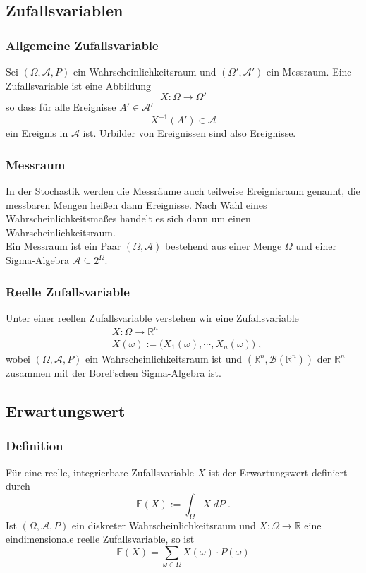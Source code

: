 \documentclass[a4paper]{article}
\begin{document}
\subsection{Zufallsvariablen}

\subsubsection{Allgemeine Zufallsvariable}
Sei $(\Omega, \mathcal{A}, P)$ ein Wahrscheinlichkeitsraum und $(\Omega', \mathcal{A}')$ ein Messraum. Eine Zufallsvariable ist eine Abbildung
$$X : \Omega \to \Omega'$$ 
so dass für alle Ereignisse $A' \in  \mathcal{A}'$
$$ X^{-1} (A') \in \mathcal{A}$$
 ein Ereignis in $\mathcal{A}$ ist. Urbilder von Ereignissen sind also Ereignisse.

\subsubsection{Messraum}
In der Stochastik werden die Messräume auch teilweise Ereignisraum genannt, die messbaren Mengen heißen dann Ereignisse. Nach Wahl eines Wahrscheinlichkeitsmaßes handelt es sich dann um einen Wahrscheinlichkeitsraum.\\

Ein Messraum ist ein Paar $(\Omega, \mathcal{A})$ bestehend aus einer Menge $\Omega$ und einer Sigma-Algebra $\mathcal{A} \subseteq 2^{\Omega}$.

\subsubsection{Reelle Zufallsvariable}
Unter einer reellen Zufallsvariable verstehen wir eine Zufallsvariable 
\begin{align*}
& X : \Omega \to \mathbb{R}^n \\
& X(\omega) := \biggl(X_1(\omega), \cdots , X_n(\omega)  \biggr) \; ,
\end{align*}
wobei $(\Omega, \mathcal{A}, P)$ ein Wahrscheinlichkeitsraum ist und $(\mathbb{R}^n, \mathcal{B}(\mathbb{R}^n))$ der $\mathbb{R}^n$ zusammen mit der Borel'schen Sigma-Algebra ist.

\pagebreak
\subsection{Erwartungswert}

\subsubsection{Definition}
Für eine reelle, integrierbare Zufallsvariable $X$ ist der Erwartungswert definiert durch
$$ \mathbb{E} (X) := \int_{\Omega} X \; dP \; .$$
Ist $(\Omega, \mathcal{A}, P)$ ein diskreter Wahrscheinlichkeitsraum und $X :\Omega \to \mathbb{R}$ eine eindimensionale reelle Zufallsvariable, so ist
$$ \mathbb{E} (X) = \sum_{\omega \in \Omega}  X(\omega) \cdot P(\omega)$$
\end{document}
